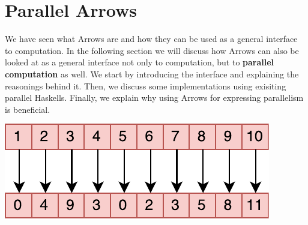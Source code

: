 \section{Parallel Arrows}
We have seen what Arrows are and how they can be used as a general interface to computation. In the following section we will discuss how Arrows can also be looked at as a general interface not only to computation, but to \textbf{parallel computation} as well. We start by introducing the interface and explaining the reasonings behind it. Then, we discuss some implementations using exisiting parallel Haskells. Finally, we explain why using Arrows for expressing parallelism is beneficial.
\begin{center}
	\includegraphics[scale=0.7]{images/parEvalN}
\end{center}
